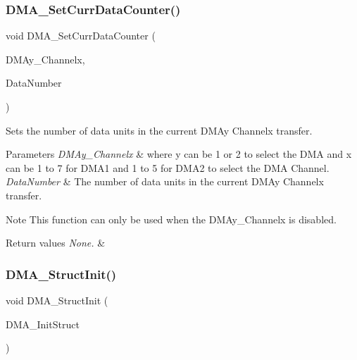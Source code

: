 \subsubsection{\texorpdfstring{DMA\_SetCurrDataCounter()}{DMA\_SetCurrDataCounter()}}
{\footnotesize\ttfamily void D\+M\+A\+\_\+\+Set\+Curr\+Data\+Counter (\begin{DoxyParamCaption}\item[{\mbox{\hyperlink{struct_d_m_a___channel___type_def}{D\+M\+A\+\_\+\+Channel\+\_\+\+Type\+Def}} $\ast$}]{D\+M\+Ay\+\_\+\+Channelx,  }\item[{uint16\+\_\+t}]{Data\+Number }\end{DoxyParamCaption})}



Sets the number of data units in the current D\+M\+Ay Channelx transfer. 


\begin{DoxyParams}{Parameters}
{\em D\+M\+Ay\+\_\+\+Channelx} & where y can be 1 or 2 to select the D\+MA and x can be 1 to 7 for D\+M\+A1 and 1 to 5 for D\+M\+A2 to select the D\+MA Channel. \\
\hline
{\em Data\+Number} & The number of data units in the current D\+M\+Ay Channelx transfer.\\
\hline
\end{DoxyParams}
\begin{DoxyNote}{Note}
This function can only be used when the D\+M\+Ay\+\_\+\+Channelx is disabled.
\end{DoxyNote}

\begin{DoxyRetVals}{Return values}
{\em None.} & \\
\hline
\end{DoxyRetVals}
\mbox{\label{group___d_m_a___exported___functions_ga0f7f95f750a90a6824f4e9b6f58adc7e}} 
\subsubsection{\texorpdfstring{DMA\_StructInit()}{DMA\_StructInit()}}
{\footnotesize\ttfamily void D\+M\+A\+\_\+\+Struct\+Init (\begin{DoxyParamCaption}\item[{\mbox{\hyperlink{struct_d_m_a___init_type_def}{D\+M\+A\+\_\+\+Init\+Type\+Def}} $\ast$}]{D\+M\+A\+\_\+\+Init\+Struct }\end{DoxyParamCaption})}



